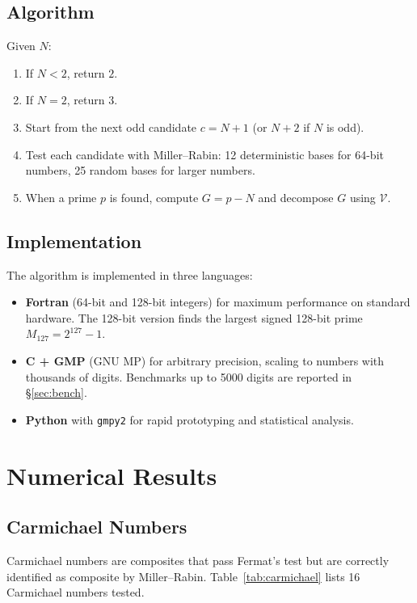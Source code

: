 \documentclass[12pt,a4paper]{article}
\theoremstyle{plain}
\begin{document}
\subsection{Algorithm}
\label{sec:algo}

Given $N$:
\begin{enumerate}
  \item If $N<2$, return $2$.
  \item If $N=2$, return $3$.
  \item Start from the next odd candidate $c=N+1$ (or $N+2$ if
    $N$ is odd).
  \item Test each candidate with Miller--Rabin: 12 deterministic
    bases for 64-bit numbers, 25 random bases for larger numbers.
  \item When a prime $p$ is found, compute $G=p-N$ and decompose
    $G$ using $\mathcal{V}$.
\end{enumerate}

\subsection{Implementation}
\label{sec:impl}

The algorithm is implemented in three languages:
\begin{itemize}
  \item {\bf Fortran} (64-bit and 128-bit integers) for maximum
    performance on standard hardware.  The 128-bit version finds
    the largest signed 128-bit prime $M_{127}=2^{127}-1$.
  \item {\bf C + GMP} (GNU MP) for arbitrary precision, scaling
    to numbers with thousands of digits.  Benchmarks up to 5000
    digits are reported in \S\ref{sec:bench}.
  \item {\bf Python} with {\tt gmpy2} for rapid prototyping and
    statistical analysis.
\end{itemize}

\section{Numerical Results}
\label{sec:num}

\subsection{Carmichael Numbers}
\label{sec:carmichael}

Carmichael numbers are composites that pass Fermat's test but are
correctly identified as composite by Miller--Rabin.
Table~\ref{tab:carmichael} lists 16 Carmichael numbers tested.
\end{document}
